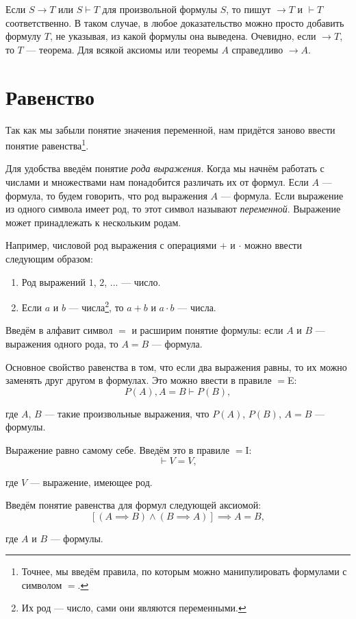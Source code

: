 Если $S\to T$ или $S\vdash T$ для произвольной формулы $S$,
то пишут $\to T$ и $\vdash T$ соответственно. В таком случае,
в любое доказательство можно просто добавить формулу $T$,
не указывая, из какой формулы она выведена. Очевидно,
если $\to T$, то $T$ --- теорема. Для всякой аксиомы или теоремы $A$
справедливо $\to A$.

\section{Равенство}

Так как мы забыли понятие значения переменной,
нам придётся заново ввести понятие равенства\footnote{
	Точнее, мы введём правила, по которым можно манипулировать
	формулами с символом $=$.
}.

Для удобства введём понятие {\it рода выражения}. Когда мы начнём работать с числами
и множествами нам понадобится различать их от формул. Если $A$ --- формула,
то будем говорить, что род выражения $A$ --- формула. Если выражение из одного
символа имеет род, то этот символ называют {\it переменной}. Выражение может
принадлежать к нескольким родам.

Например, числовой род выражения с операциями $+$ и $\cdot$
можно ввести следующим образом:
\begin{enumerate}
	\item{}Род выражений $1$, $2$, ... --- число.
	\item{}Если $a$ и $b$ --- числа\footnote{Их род --- число,
		сами они являются переменными.}, то
	$a+b$ и $a\cdot b$ --- числа.
\end{enumerate}

Введём в алфавит символ $=$ и расширим понятие формулы: если $A$ и $B$ --- выражения
одного рода, то $A=B$ --- формула.

Основное свойство равенства в том, что если два выражения равны, то их можно
заменять друг другом в формулах. Это можно ввести в правиле $=$E:
\[
	P(A),A=B\vdash P(B),
\]

где $A$, $B$ --- такие произвольные выражения, что $P(A)$, $P(B)$, $A=B$ --- формулы.

Выражение равно самому себе. Введём это в правиле $=$I:
\[
	\vdash V=V,
\]

где $V$ --- выражение, имеющее род.

Введём понятие равенства для формул следующей аксиомой:
\[
	[(A\implies B)\land (B\implies A)]\implies A=B,
\]

где $A$ и $B$ --- формулы.

